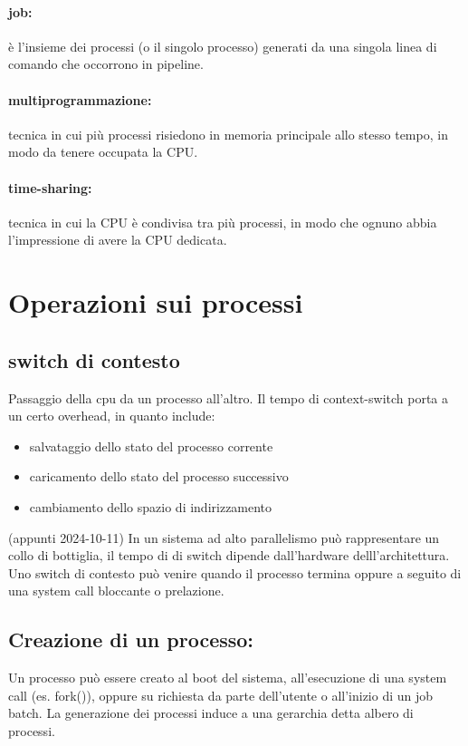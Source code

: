 \documentclass{article}
\begin{document}
\paragraph{job:} è l'insieme dei processi (o il singolo processo) generati da una singola linea di comando che occorrono in pipeline.
\paragraph{multiprogrammazione:} tecnica in cui più processi risiedono in memoria principale allo stesso tempo, in modo da tenere occupata la CPU.
\paragraph{time-sharing:} tecnica in cui la CPU è condivisa tra più processi, in modo che ognuno abbia l'impressione di avere la CPU dedicata.

\section{Operazioni sui processi}
\subsection{switch di contesto}
Passaggio della cpu da un processo all'altro. Il tempo di context-switch porta a un certo overhead, in quanto include:
\begin{itemize}
    \item salvataggio dello stato del processo corrente
    \item caricamento dello stato del processo successivo
    \item cambiamento dello spazio di indirizzamento
\end{itemize}
(appunti 2024-10-11)
In un sistema ad alto parallelismo può rappresentare un collo di bottiglia, il tempo di di switch dipende dall'hardware delll'architettura.
Uno switch di contesto può venire quando il processo termina oppure a seguito di una system call bloccante o prelazione.

\subsection{Creazione di un processo:}
Un processo può essere creato al boot del sistema, all'esecuzione di una system call (es. fork()), 
oppure su richiesta da parte dell'utente o all'inizio di un job batch. La generazione dei processi induce a una gerarchia detta 
albero di processi.
\end{document}

